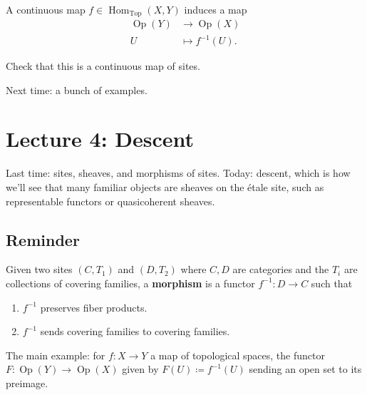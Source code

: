 \begin{example}[?]

A continuous map
\(f\in {\operatorname{Hom}}_{\operatorname{Top}}(X, Y)\) induces a map
\begin{align*}  
{\operatorname{Op}}(Y) &\to {\operatorname{Op}}(X) \\
U &\mapsto f^{-1}(U)
.\end{align*}

\end{example}

\begin{exercise}[?]

Check that this is a continuous map of sites.

\end{exercise}

Next time: a bunch of examples.

\hypertarget{lecture-4-descent}{%
\section{Lecture 4: Descent}\label{lecture-4-descent}}

Last time: sites, sheaves, and morphisms of sites. Today: descent, which
is how we'll see that many familiar objects are sheaves on the étale
site, such as representable functors or quasicoherent sheaves.

\hypertarget{reminder}{%
\subsection{Reminder}\label{reminder}}

\begin{definition}

Given two sites \((C, T_1)\) and \((D, T_2)\) where \(C, D\) are
categories and the \(T_i\) are collections of covering families, a
\textbf{morphism} is a functor \(f^{-1} :D\to C\) such that

\begin{enumerate}
\def\labelenumi{\arabic{enumi}.}
\tightlist
\item
  \(f^{-1}\) preserves fiber products.
\item
  \(f^{-1}\) sends covering families to covering families.
\end{enumerate}

\end{definition}

\begin{example}[?]

The main example: for \(f:X\to Y\) a map of topological spaces, the
functor \(F: {\operatorname{Op}}(Y) \to {\operatorname{Op}}(X)\) given
by \(F(U) \coloneqq f^{-1}(U)\) sending an open set to its preimage.

\end{example}

